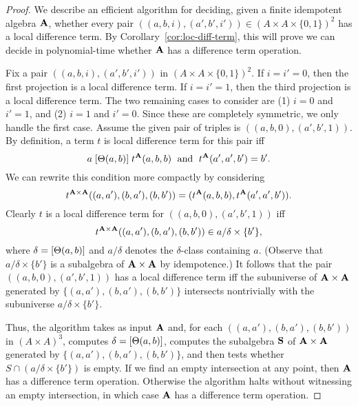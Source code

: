 \begin{proof}
  We describe an efficient algorithm for deciding,
  given a finite idempotent algebra $\mathbf{A}$,
  whether every pair $((a,b,i), (a',b',i')) \in (A\times A \times \{0,1\})^2$ has a local
  difference term.  By Corollary~\ref{cor:loc-diff-term}, this will prove we
  can decide in polynomial-time whether $\mathbf{A}$ has a difference term operation.

  Fix a pair
  $((a,b,i), (a',b',i'))$ in $(A\times A \times \{0,1\})^2$. If $i = i' = 0$,
  then the first projection is a local difference term. If $i = i' = 1$,  
    then the third projection is a local difference term. The two remaining cases to
    consider are (1) $i = 0$ and $i'=1$, and (2)
    $i = 1$ and $i'=0$. Since these are completely symmetric, we only handle the
    first case. Assume  the given pair of triples is
    $((a,b,0), (a',b',1))$.  By definition, a term $t$ is local difference term
    for this pair iff
    \[
    a\mathrel{[\Theta(a,b)]} t^{\mathbf{A}}(a,b,b) \; \text{ and } \;
    t^{\mathbf{A}}(a',a',b') = b'.
    \]
    We can rewrite this condition more compactly by
    considering 
    \[t^{\mathbf{A}\times \mathbf{A}}((a,a'), (b,a'), (b,b')) =
    (t^{\mathbf{A}}(a,b,b),t^{\mathbf{A}}(a',a',b')).\]
    Clearly $t$ is a local difference term for
    $((a,b,0), (a',b',1))$ iff
    \[
    t^{\mathbf{A}\times \mathbf{A}}((a,a'), (b,a'), (b,b'))\in a/\delta \times \{b'\},
    \]
    where $\delta = [\Theta(a,b)]$ and $a/\delta$ denotes the
    $\delta$-class containing $a$.
    (Observe that $a/\delta \times \{b'\}$ is a subalgebra of $\mathbf{A} \times \mathbf{A}$
    by idempotence.)
    It follows that the pair
    $((a,b,0), (a',b',1))$ has a local difference term iff
    the subuniverse of $\mathbf{A}\times \mathbf{A}$ generated by
    $\{(a,a'), (b,a'), (b,b')\}$ intersects nontrivially with the subuniverse
    $a/\delta \times \{b'\}$.

    Thus, the algorithm takes as input $\mathbf{A}$ and, for each 
    $((a,a'), (b,a'), (b,b'))$ in $(A\times A)^3$, computes
    $\delta = [\Theta(a,b)]$, computes the subalgebra
    $\mathbf{S}$ of $\mathbf{A}\times \mathbf{A}$ generated by
    $\{(a,a'), (b,a'), (b,b')\}$, and then
    tests whether $S \cap (a/\delta \times \{b'\})$ is empty.
    If we find an empty intersection at any point, then
    $\mathbf{A}$ has a difference term operation.
    Otherwise the algorithm halts without witnessing an empty
    intersection, in which case $\mathbf{A}$ has a difference term operation.


\end{proof}
